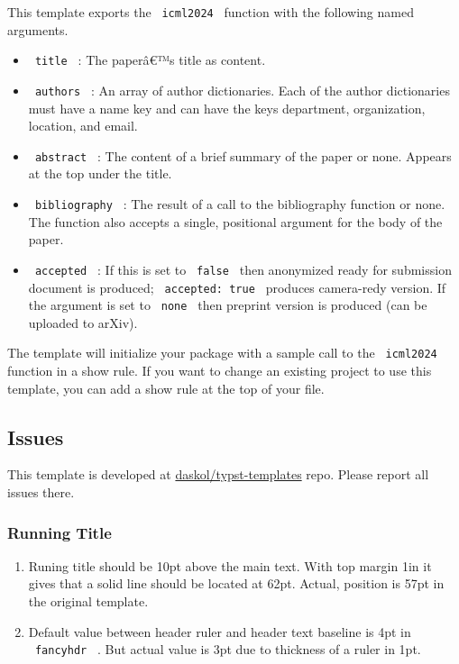 This template exports the \texttt{\ icml2024\ } function with the
following named arguments.

\begin{itemize}
\tightlist
\item
  \texttt{\ title\ } : The paperâ€™s title as content.
\item
  \texttt{\ authors\ } : An array of author dictionaries. Each of the
  author dictionaries must have a name key and can have the keys
  department, organization, location, and email.
\item
  \texttt{\ abstract\ } : The content of a brief summary of the paper or
  none. Appears at the top under the title.
\item
  \texttt{\ bibliography\ } : The result of a call to the bibliography
  function or none. The function also accepts a single, positional
  argument for the body of the paper.
\item
  \texttt{\ accepted\ } : If this is set to \texttt{\ false\ } then
  anonymized ready for submission document is produced;
  \texttt{\ accepted:\ true\ } produces camera-redy version. If the
  argument is set to \texttt{\ none\ } then preprint version is produced
  (can be uploaded to arXiv).
\end{itemize}

The template will initialize your package with a sample call to the
\texttt{\ icml2024\ } function in a show rule. If you want to change an
existing project to use this template, you can add a show rule at the
top of your file.

\subsection{Issues}\label{issues}

This template is developed at
\href{https://github.com/daskol/typst-templates}{daskol/typst-templates}
repo. Please report all issues there.

\subsubsection{Running Title}\label{running-title}

\begin{enumerate}
\tightlist
\item
  Runing title should be 10pt above the main text. With top margin 1in
  it gives that a solid line should be located at 62pt. Actual, position
  is 57pt in the original template.
\item
  Default value between header ruler and header text baseline is 4pt in
  \texttt{\ fancyhdr\ } . But actual value is 3pt due to thickness of a
  ruler in 1pt.
\end{enumerate}

